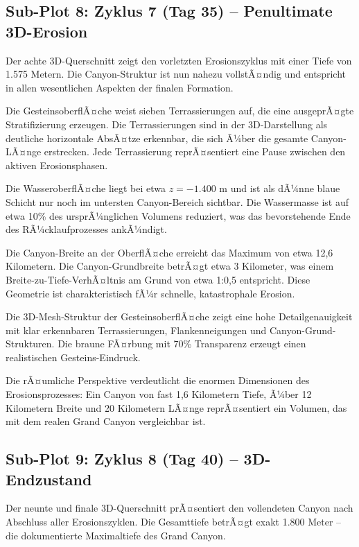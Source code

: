 ﻿\documentclass[12pt,a4paper]{report}
\begin{document}
\subsection{Sub-Plot 8: Zyklus 7 (Tag 35) -- Penultimate 3D-Erosion}

Der achte 3D-Querschnitt zeigt den vorletzten Erosionszyklus mit einer Tiefe von 1.575 Metern. Die Canyon-Struktur ist nun nahezu vollstÃ¤ndig und entspricht in allen wesentlichen Aspekten der finalen Formation.

Die GesteinsoberflÃ¤che weist sieben Terrassierungen auf, die eine ausgeprÃ¤gte Stratifizierung erzeugen. Die Terrassierungen sind in der 3D-Darstellung als deutliche horizontale AbsÃ¤tze erkennbar, die sich Ã¼ber die gesamte Canyon-LÃ¤nge erstrecken. Jede Terrassierung reprÃ¤sentiert eine Pause zwischen den aktiven Erosionsphasen.

Die WasseroberflÃ¤che liegt bei etwa $z = -1.400$ m und ist als dÃ¼nne blaue Schicht nur noch im untersten Canyon-Bereich sichtbar. Die Wassermasse ist auf etwa 10\% des ursprÃ¼nglichen Volumens reduziert, was das bevorstehende Ende des RÃ¼cklaufprozesses ankÃ¼ndigt.

Die Canyon-Breite an der OberflÃ¤che erreicht das Maximum von etwa 12,6 Kilometern. Die Canyon-Grundbreite betrÃ¤gt etwa 3 Kilometer, was einem Breite-zu-Tiefe-VerhÃ¤ltnis am Grund von etwa 1:0,5 entspricht. Diese Geometrie ist charakteristisch fÃ¼r schnelle, katastrophale Erosion.

Die 3D-Mesh-Struktur der GesteinsoberflÃ¤che zeigt eine hohe Detailgenauigkeit mit klar erkennbaren Terrassierungen, Flankenneigungen und Canyon-Grund-Strukturen. Die braune FÃ¤rbung mit 70\% Transparenz erzeugt einen realistischen Gesteins-Eindruck.

Die rÃ¤umliche Perspektive verdeutlicht die enormen Dimensionen des Erosionsprozesses: Ein Canyon von fast 1,6 Kilometern Tiefe, Ã¼ber 12 Kilometern Breite und 20 Kilometern LÃ¤nge reprÃ¤sentiert ein Volumen, das mit dem realen Grand Canyon vergleichbar ist.

\subsection{Sub-Plot 9: Zyklus 8 (Tag 40) -- 3D-Endzustand}

Der neunte und finale 3D-Querschnitt prÃ¤sentiert den vollendeten Canyon nach Abschluss aller Erosionszyklen. Die Gesamttiefe betrÃ¤gt exakt 1.800 Meter -- die dokumentierte Maximaltiefe des Grand Canyon.
\end{document}

